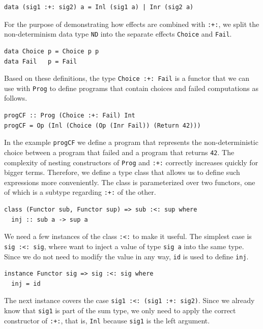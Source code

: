 \documentclass[a4paper, 11pt, fleqn, twoside, abstract=on]{scrreprt}
\newcommand{\hinl}[1]{\texttt{#1}}
\newcommand{\cinl}[1]{\texttt{#1}}
\begin{document}
\begin{verbatim}
data (sig1 :+: sig2) a = Inl (sig1 a) | Inr (sig2 a)
\end{verbatim}

For the purpose of demonstrating how effects are combined with \cinl{:+:}, we split the non-determinism data type \hinl{ND} into the separate effects \hinl{Choice} and \hinl{Fail}.

\begin{verbatim}
data Choice p = Choice p p
data Fail   p = Fail
\end{verbatim}

Based on these definitions, the type \hinl{Choice :+: Fail} is a functor that we can use with \hinl{Prog} to define programs that contain choices and failed computations as follows.

\begin{verbatim}
progCF :: Prog (Choice :+: Fail) Int
progCF = Op (Inl (Choice (Op (Inr Fail)) (Return 42)))
\end{verbatim}

In the example \hinl{progCF} we define a program that represents the non-deterministic choice between a program that failed and a program that returns \hinl{42}.
The complexity of nesting constructors of \hinl{Prog} and \hinl{:+:} correctly increases quickly for bigger terms.
Therefore, we define a type class that allows us to define such expressions more conveniently.
The class is parameterized over two functors, one of which is a subtype regarding \hinl{:+:} of the other.

\begin{verbatim}
class (Functor sub, Functor sup) => sub :<: sup where
  inj :: sub a -> sup a
\end{verbatim}

We need a few instances of the class \hinl{:<:} to make it useful.
The simplest case is \hinl{sig :<: sig}, where want to inject a value of type \hinl{sig a} into the same type.
Since we do not need to modify the value in any way, \hinl{id} is used to define \hinl{inj}.

\begin{verbatim}
instance Functor sig => sig :<: sig where
  inj = id  
\end{verbatim}

The next instance covers the case \hinl{sig1 :<: (sig1 :+: sig2)}.
Since we already know that \hinl{sig1} is part of the sum type, we only need to apply the correct constructor of \hinl{:+:}, that is, \hinl{Inl} because \hinl{sig1} is the left argument.
\end{document}
